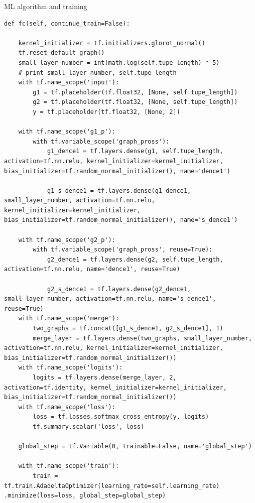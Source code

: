 \begin{code}
\caption{ML algorithm and training}
\label{lst:mlat}
\begin{verbatim}
def fc(self, continue_train=False):

    kernel_initializer = tf.initializers.glorot_normal()
    tf.reset_default_graph()
    small_layer_number = int(math.log(self.tupe_length) * 5)
    # print small_layer_number, self.tupe_length
    with tf.name_scope('input'):
        g1 = tf.placeholder(tf.float32, [None, self.tupe_length])
        g2 = tf.placeholder(tf.float32, [None, self.tupe_length])
        y = tf.placeholder(tf.float32, [None, 2])

    with tf.name_scope('g1_p'):
        with tf.variable_scope('graph_pross'):
            g1_dence1 = tf.layers.dense(g1, self.tupe_length, activation=tf.nn.relu, kernel_initializer=kernel_initializer, bias_initializer=tf.random_normal_initializer(), name='dence1')

            g1_s_dence1 = tf.layers.dense(g1_dence1, small_layer_number, activation=tf.nn.relu, kernel_initializer=kernel_initializer, bias_initializer=tf.random_normal_initializer(), name='s_dence1')

    with tf.name_scope('g2_p'):
        with tf.variable_scope('graph_pross', reuse=True):
            g2_dence1 = tf.layers.dense(g2, self.tupe_length, activation=tf.nn.relu, name='dence1', reuse=True)

            g2_s_dence1 = tf.layers.dense(g2_dence1, small_layer_number, activation=tf.nn.relu, name='s_dence1', reuse=True)
    with tf.name_scope('merge'):
        two_graphs = tf.concat([g1_s_dence1, g2_s_dence1], 1)
        merge_layer = tf.layers.dense(two_graphs, small_layer_number, activation=tf.nn.relu, kernel_initializer=kernel_initializer, bias_initializer=tf.random_normal_initializer())
    with tf.name_scope('logits'):
        logits = tf.layers.dense(merge_layer, 2, activation=tf.identity, kernel_initializer=kernel_initializer, bias_initializer=tf.random_normal_initializer())
    with tf.name_scope('loss'):
        loss = tf.losses.softmax_cross_entropy(y, logits)
        tf.summary.scalar('loss', loss)

    global_step = tf.Variable(0, trainable=False, name='global_step')

    with tf.name_scope('train'):
        train = tf.train.AdadeltaOptimizer(learning_rate=self.learning_rate) .minimize(loss=loss, global_step=global_step)


\end{verbatim}
\end{code}
